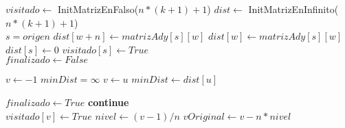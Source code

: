 \begin{algorithm}[H]
\begin{algorithmic}
    
	\State $visitado \gets$ InitMatrizEnFalso($n*(k+1)+1$)    
	\State $dist \gets$ InitMatrizEnInfinito($n*(k+1)+1$)     \\
	
	\State $s = origen$    
	    
		    
			    
				    
					\State $dist[w+n] \gets matrizAdy[s][w]$    
				\EndIf
			\Else
				\State $dist[w] \gets matrizAdy[s][w]$    
			\EndIf
		\EndIf
	\EndFor \\
	
	\State $dist[s] \gets 0$    
	\State $visitado[s] \gets True$     \\
	
	\State $finalizado \gets False$    
	
	    
		\State $v \gets -1$    
		\State $minDist = \infty$    
		    
			    
				\State $v \gets u$    
				\State $minDist \gets dist[u]$    
			\EndIf
		\EndFor
	
		    
			\State $finalizado \gets True$    
			\State \textbf{continue} 
		\EndIf \\
	
		\State $visitado[v] \gets True$    
		\State $nivel \gets (v-1)/n$    
		\State $vOriginal \gets v - n * nivel$      \\
	

\end{algorithmic}
\end{algorithm}
